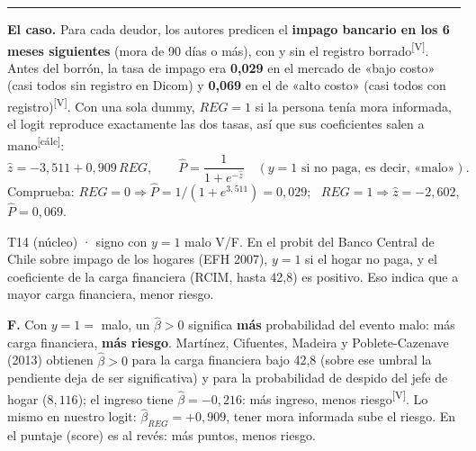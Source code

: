 \documentclass[10pt,a4paper]{article}
\newcommand{\V}{\textsuperscript{\textcolor{green!45!black}{[V]}}}
\newcommand{\calc}{\textsuperscript{\textcolor{blue!60!black}{[cálc]}}}
\newcommand{\acto}[1]{\vspace{6pt}{\large\bfseries #1}\par\vspace{2pt}\hrule\vspace{4pt}}
\newcommand{\Ph}{\hat P}
\begin{document}
\acto{Acto 1. ¿Quién no paga? Logit y MPL del impago bancario}

\textbf{El caso.} Para cada deudor, los autores predicen el \textbf{impago bancario en los 6 meses siguientes} (mora de 90 días o más), con y sin el registro borrado\V. Antes del borrón, la tasa de impago era \textbf{0,029} en el mercado de «bajo costo» (casi todos sin registro en Dicom) y \textbf{0,069} en el de «alto costo» (casi todos con registro)\V. Con una sola dummy, $REG=1$ si la persona tenía mora informada, el logit reproduce exactamente las dos tasas, así que sus coeficientes salen a mano\calc:
\[
\hat z=-3{,}511+0{,}909\,REG,\qquad \Ph=\frac{1}{1+e^{-\hat z}}\quad (y=1 \text{ si no paga, es decir, «malo»}).
\]
Comprueba: $REG=0\Rightarrow \Ph=1/(1+e^{3,511})=0{,}029$; \ $REG=1\Rightarrow \hat z=-2{,}602$, $\Ph=0{,}069$.

\begin{enun}{T14 (núcleo) · signo con $y=1$ malo}
V/F. En el probit del Banco Central de Chile sobre impago de los hogares (EFH 2007), $y=1$ si el hogar no paga, y el coeficiente de la carga financiera (RCIM, hasta 42,8) es positivo. Eso indica que a mayor carga financiera, menor riesgo.
\end{enun}
\begin{ejemplar}
\textbf{F.} Con $y=1=$ malo, un $\hat\beta>0$ significa \textbf{más} probabilidad del evento malo: más carga financiera, \textbf{más riesgo}. Martínez, Cifuentes, Madeira y Poblete-Cazenave (2013) obtienen $\hat\beta>0$ para la carga financiera bajo 42,8 (sobre ese umbral la pendiente deja de ser significativa) y para la probabilidad de despido del jefe de hogar ($8{,}116$); el ingreso tiene $\hat\beta=-0{,}216$: más ingreso, menos riesgo\V. Lo mismo en nuestro logit: $\hat\beta_{REG}=+0{,}909$, tener mora informada sube el riesgo. En el puntaje (score) es al revés: más puntos, menos riesgo.
\end{ejemplar}
\end{document}
